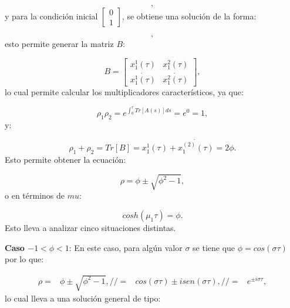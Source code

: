 \documentclass[a4paper,10pt]{report}
\begin{document}
\begin{equation}
[\begin{array}{c}
x_1^1(t) \\
\dot{x_1^1(t)}
\end{array}],
\end{equation} y para la condición inicial $[\begin{array}{c} 0 \\ 1 \end{array}]$, se obtiene una solución de la forma:

\begin{equation}
[\begin{array}{c}
x_1^2(t) \\
\dot{x_1^2(t)}
\end{array}],
\end{equation} esto permite generar la matriz $B$:

\begin{equation}
B= [\begin{array}{cc}

x_1^1(\tau) & x_1^2(\tau) \\
\dot{x_1^1(\tau)} & \dot{x_1^2(\tau)}

\end{array}],
\end{equation} lo cual permite calcular los multiplicadores característicos, ya que:

\begin{equation}
\rho_1 \rho_2 = e^{\int_0^\tau Tr[A(s)]ds} = e^0 = 1,
\end{equation} y:

\begin{equation}
\rho_1 + \rho_2 = Tr[B] =x_1^1(\tau)+ \dot{x_1^{(2)}(\tau)} = 2\phi.
\end{equation} Esto permite obtener la ecuación:

\begin{equation}
\rho = \phi \pm \sqrt{\phi^2 -1},
\end{equation} o en términos de $mu$:

\begin{equation}
cosh(\mu_1 \tau) = \phi.
\end{equation} Esto lleva a analizar cinco situaciones distintas.

\textbf{Caso $ -1 < \phi < 1$}: En este caso, para algún valor $\sigma$ se tiene que $\phi = cos(\sigma \tau)$ por lo que:

\begin{align*}
\rho =& \phi \pm \sqrt{\phi^2 -1},//
=& cos(\sigma \tau) \pm isen(\sigma \tau), //
=& e^{\pm i\sigma \tau},
\end{align*} lo cual lleva a una solución general de tipo:
\end{document}

